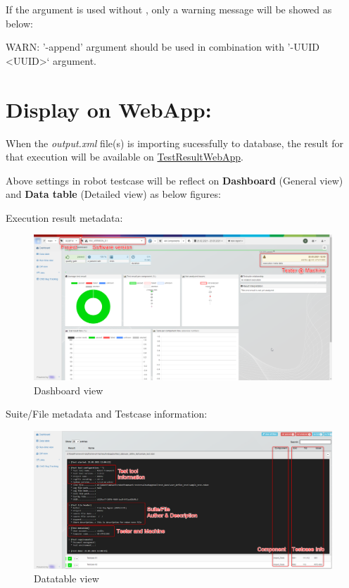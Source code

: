 If the argument  is used without , only a 
warning message will be showed as below:
\begin{robotlog}
WARN: '-append' argument should be used in combination with '-UUID <UUID>` argument.
\end{robotlog}


\newpage
\hypertarget{description-display-on-webapp}{%
\section{Display on WebApp:}\label{description-display-on-webapp}}

When the \emph{output.xml} file(s) is importing sucessfully to database,
the result for that execution will be available on
\href{https://github.com/test-fullautomation/testresultwebapp}{TestResultWebApp}.

Above settings in robot testcase will be reflect on \textbf{Dashboard}
(General view) and \textbf{Data table} (Detailed view) as below figures:

Execution result metadata:

\begin{figure}[h!]
  \includegraphics[width=1\linewidth]{./pictures/Dashboard.png}
  \caption{Dashboard view}
\end{figure}

Suite/File metadata and Testcase information:

\begin{figure}[h!]
  \includegraphics[width=1\linewidth]{./pictures/Datatable.png}
  \caption{Datatable view}
\end{figure}